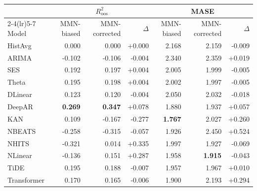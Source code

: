 \begin{tabular}{lrrrrrr}
\toprule
& \multicolumn{3}{c}{$R^2_{\text{oos}}$} & \multicolumn{3}{c}{MASE} \\
\cmidrule(lr){2-4}\cmidrule(lr){5-7}
Model & MMN-biased & MMN-corrected & $\Delta$ & MMN-biased & MMN-corrected & $\Delta$ \\
\midrule
HistAvg & 0.000 & 0.000 & +0.000 & 2.168 & 2.159 & -0.009 \\
ARIMA & -0.102 & -0.106 & -0.004 & 2.340 & 2.359 & +0.019 \\
SES & 0.192 & 0.197 & +0.004 & 2.005 & 1.999 & -0.005 \\
Theta & 0.195 & 0.198 & +0.004 & 2.002 & 1.997 & -0.005 \\
DLinear & 0.123 & 0.120 & -0.004 & 2.050 & 2.032 & -0.018 \\
DeepAR & \textbf{0.269} & \textbf{0.347} & +0.078 & 1.880 & 1.937 & +0.057 \\
KAN & 0.109 & -0.167 & -0.277 & \textbf{1.767} & 2.027 & +0.260 \\
NBEATS & -0.258 & -0.315 & -0.057 & 1.926 & 2.450 & +0.524 \\
NHITS & -0.321 & 0.014 & +0.335 & 1.997 & 1.927 & -0.069 \\
NLinear & -0.136 & 0.151 & +0.287 & 1.958 & \textbf{1.915} & -0.043 \\
TiDE & 0.195 & 0.188 & -0.007 & 1.957 & 1.967 & +0.010 \\
Transformer & 0.170 & 0.165 & -0.006 & 1.900 & 2.193 & +0.294 \\
\bottomrule
\end{tabular}
